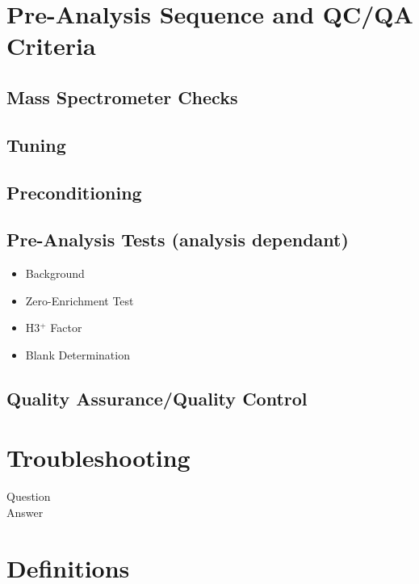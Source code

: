 \documentclass[12pt]{../SOP3}\usepackage[]{graphicx}\usepackage[]{color}
\begin{document}
\newpage

\section{Pre-Analysis Sequence and QC/QA Criteria}

\subsection{Mass Spectrometer Checks}

\subsection{Tuning}

\subsection{Preconditioning}

\subsection{Pre-Analysis Tests (analysis dependant)}
\begin{itemize}
  \item{Background}
  \item{Zero-Enrichment Test}
  \item{H3$^+$ Factor}
  \item{Blank Determination}
\end{itemize}

\subsection{Quality Assurance/Quality Control}

\section{Troubleshooting}

\NP Question \\
Answer

\section{Definitions}
\end{document}
